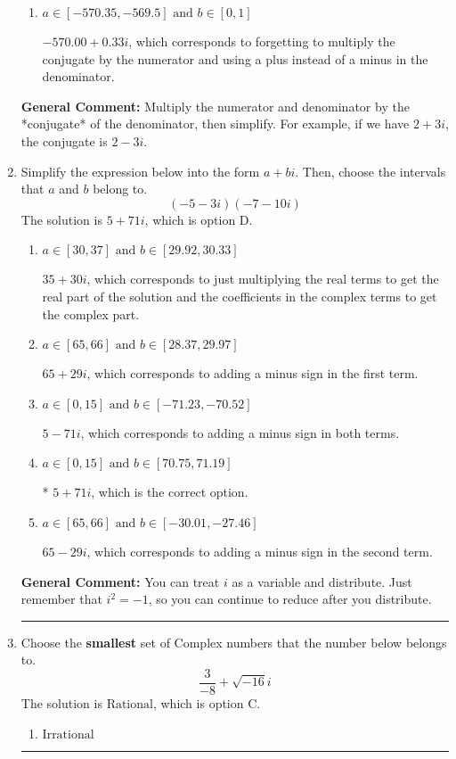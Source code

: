 \documentclass{extbook}[14pt]
\newcommand{\litem}[1]{\item #1

\rule{\textwidth}{0.4pt}}
\begin{document}
\begin{enumerate}
{\begin{enumerate}[label=\Alph*.]
* $-12.67  + 0.33 i$, which is the correct option.
\item \( a \in [-570.35, -569.5] \text{ and } b \in [0, 1] \)

 $-570.00  + 0.33 i$, which corresponds to forgetting to multiply the conjugate by the numerator and using a plus instead of a minus in the denominator.
\end{enumerate}

\textbf{General Comment:} Multiply the numerator and denominator by the *conjugate* of the denominator, then simplify. For example, if we have $2+3i$, the conjugate is $2-3i$.
}
\litem{
Simplify the expression below into the form $a+bi$. Then, choose the intervals that $a$ and $b$ belong to.
\[ (-5 - 3 i)(-7 - 10 i) \]
The solution is \( 5 + 71 i \), which is option D.\begin{enumerate}[label=\Alph*.]
\item \( a \in [30, 37] \text{ and } b \in [29.92, 30.33] \)

 $35 + 30 i$, which corresponds to just multiplying the real terms to get the real part of the solution and the coefficients in the complex terms to get the complex part.
\item \( a \in [65, 66] \text{ and } b \in [28.37, 29.97] \)

 $65 + 29 i$, which corresponds to adding a minus sign in the first term.
\item \( a \in [0, 15] \text{ and } b \in [-71.23, -70.52] \)

 $5 - 71 i$, which corresponds to adding a minus sign in both terms.
\item \( a \in [0, 15] \text{ and } b \in [70.75, 71.19] \)

* $5 + 71 i$, which is the correct option.
\item \( a \in [65, 66] \text{ and } b \in [-30.01, -27.46] \)

 $65 - 29 i$, which corresponds to adding a minus sign in the second term.
\end{enumerate}

\textbf{General Comment:} You can treat $i$ as a variable and distribute. Just remember that $i^2=-1$, so you can continue to reduce after you distribute.
}
\litem{
Choose the \textbf{smallest} set of Complex numbers that the number below belongs to.
\[ \frac{3}{-8}+\sqrt{-16}i \]
The solution is \( \text{Rational} \), which is option C.\begin{enumerate}[label=\Alph*.]
\item \( \text{Irrational} \)


\end{enumerate}}
\end{enumerate}
\end{document}
